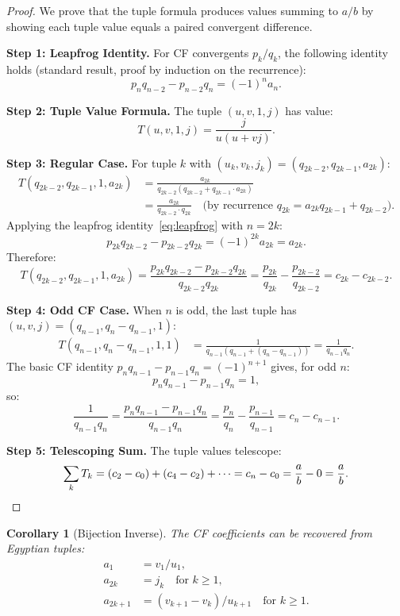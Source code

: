 \documentclass[11pt]{article}
\newtheorem{corollary}[theorem]{Corollary}
\theoremstyle{definition}
\theoremstyle{remark}
\begin{document}
\begin{proof}
We prove that the tuple formula produces values summing to $a/b$ by showing each
tuple value equals a paired convergent difference.

\textbf{Step 1: Leapfrog Identity.} For CF convergents $p_k/q_k$, the following
identity holds (standard result, proof by induction on the recurrence):
\begin{equation}\label{eq:leapfrog}
p_n q_{n-2} - p_{n-2} q_n = (-1)^n a_n.
\end{equation}

\textbf{Step 2: Tuple Value Formula.} The tuple $(u, v, 1, j)$ has value:
\[
T(u, v, 1, j) = \frac{j}{u(u + vj)}.
\]

\textbf{Step 3: Regular Case.} For tuple $k$ with $(u_k, v_k, j_k) = (q_{2k-2}, q_{2k-1}, a_{2k})$:
\begin{align*}
T(q_{2k-2}, q_{2k-1}, 1, a_{2k}) &= \frac{a_{2k}}{q_{2k-2}(q_{2k-2} + q_{2k-1} \cdot a_{2k})} \\
&= \frac{a_{2k}}{q_{2k-2} \cdot q_{2k}} \quad \text{(by recurrence $q_{2k} = a_{2k} q_{2k-1} + q_{2k-2}$)}.
\end{align*}
Applying the leapfrog identity~\eqref{eq:leapfrog} with $n = 2k$:
\[
p_{2k} q_{2k-2} - p_{2k-2} q_{2k} = (-1)^{2k} a_{2k} = a_{2k}.
\]
Therefore:
\[
T(q_{2k-2}, q_{2k-1}, 1, a_{2k}) = \frac{p_{2k} q_{2k-2} - p_{2k-2} q_{2k}}{q_{2k-2} q_{2k}}
= \frac{p_{2k}}{q_{2k}} - \frac{p_{2k-2}}{q_{2k-2}} = c_{2k} - c_{2k-2}.
\]

\textbf{Step 4: Odd CF Case.} When $n$ is odd, the last tuple has
$(u, v, j) = (q_{n-1}, q_n - q_{n-1}, 1)$:
\begin{align*}
T(q_{n-1}, q_n - q_{n-1}, 1, 1) &= \frac{1}{q_{n-1}(q_{n-1} + (q_n - q_{n-1}))} = \frac{1}{q_{n-1} q_n}.
\end{align*}
The basic CF identity $p_n q_{n-1} - p_{n-1} q_n = (-1)^{n+1}$ gives, for odd $n$:
\[
p_n q_{n-1} - p_{n-1} q_n = 1,
\]
so:
\[
\frac{1}{q_{n-1} q_n} = \frac{p_n q_{n-1} - p_{n-1} q_n}{q_{n-1} q_n} = \frac{p_n}{q_n} - \frac{p_{n-1}}{q_{n-1}} = c_n - c_{n-1}.
\]

\textbf{Step 5: Telescoping Sum.} The tuple values telescope:
\[
\sum_k T_k = (c_2 - c_0) + (c_4 - c_2) + \cdots = c_n - c_0 = \frac{a}{b} - 0 = \frac{a}{b}. \qedhere
\]
\end{proof}

\begin{corollary}[Bijection Inverse]
The CF coefficients can be recovered from Egyptian tuples:
\begin{align}
a_1 &= v_1 / u_1, \\
a_{2k} &= j_k \quad \text{for } k \geq 1, \\
a_{2k+1} &= (v_{k+1} - v_k) / u_{k+1} \quad \text{for } k \geq 1.
\end{align}
\end{corollary}
\end{document}

